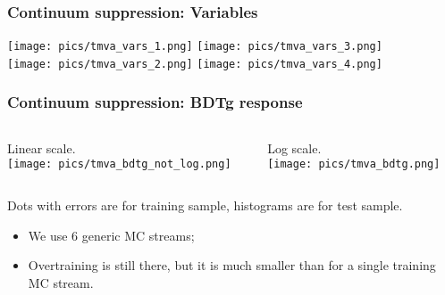 \documentclass[10 pt,compress,mathserif]{beamer}
\begin{document}
\begin{frame}
 \frametitle{Continuum suppression: Variables}
   \texttt{[image: pics/tmva\_vars\_1.png]} \texttt{[image: pics/tmva\_vars\_3.png]}\\
   \texttt{[image: pics/tmva\_vars\_2.png]} \texttt{[image: pics/tmva\_vars\_4.png]}
\end{frame}

\begin{frame}[containsverbatim]
 \frametitle{Continuum suppression: BDTg response}
 \begin{center}
 \begin{columns}
  \begin{column}{0.5\textwidth}
   Linear scale.\\
   \texttt{[image: pics/tmva\_bdtg\_not\_log.png]}\\
  \end{column}
  \begin{column}{0.5\textwidth}
   Log scale.\\
   \texttt{[image: pics/tmva\_bdtg.png]}\\
  \end{column}
 \end{columns}

  Dots with errors are for training sample, histograms are for test sample.
 \end{center}
 \begin{itemize}
  \item We use $6$ generic MC streams;
  \item Overtraining is still there, but it is much smaller than for a single training MC stream.
 \end{itemize}

\end{frame}
\end{document}
